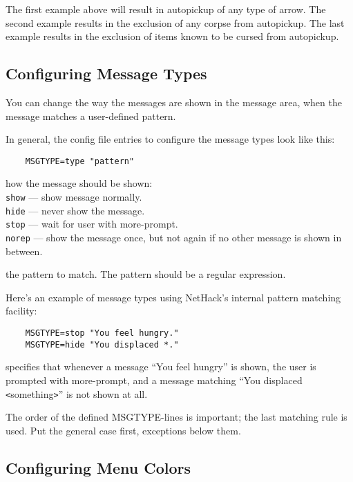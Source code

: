 The first example above will result in autopickup of any type of arrow.
The second example results in the exclusion of any corpse from autopickup.
The last example results in the exclusion of items known to be cursed from
autopickup.

\subsection*{Configuring Message Types}

You can change the way the messages are shown in the message area, when
the message matches a user-defined pattern.

In general, the config file entries to configure the message types
look like this:
\begin{verbatim}
    MSGTYPE=type "pattern"
\end{verbatim}
\blist{}
\item[\ib{type}]
how the message should be shown:
\\
{\tt show}  --- show message normally.\\
{\tt hide}  --- never show the message.\\
{\tt stop}  --- wait for user with more-prompt.\\
{\tt norep} --- show the message once, but not again if no other message is shown in between.
\item[\ib{pattern}]
the pattern to match. The pattern should be a regular expression.
\elist

Here's an example of message types using NetHack's internal
pattern matching facility:

\begin{verbatim}
    MSGTYPE=stop "You feel hungry."
    MSGTYPE=hide "You displaced *."
\end{verbatim}

specifies that whenever a message ``You feel hungry'' is shown,
the user is prompted with more-prompt, and a message matching
``You displaced  \verb+<+something\verb+>+'' is not shown at all.

The order of the defined MSGTYPE-lines is important; the last matching
rule is used. Put the general case first, exceptions below them.


\subsection*{Configuring Menu Colors}

